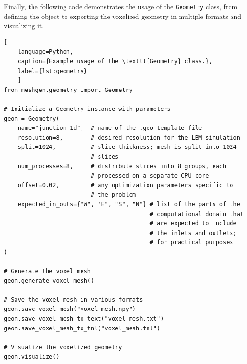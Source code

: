 Finally, the following code demonstrates the usage of the \texttt{Geometry} class, from defining the object to exporting the voxelized geometry in multiple formats and visualizing it.

\begin{lstlisting}[
	language=Python,
	caption={Example usage of the \texttt{Geometry} class.},
	label={lst:geometry}
	]
from meshgen.geometry import Geometry
	
# Initialize a Geometry instance with parameters
geom = Geometry(
	name="junction_1d",  # name of the .geo template file
	resolution=8,        # desired resolution for the LBM simulation
	split=1024,          # slice thickness; mesh is split into 1024 
						 # slices
	num_processes=8,     # distribute slices into 8 groups, each
						 # processed on a separate CPU core
	offset=0.02,		 # any optimization parameters specific to
						 # the problem
	expected_in_outs={"W", "E", "S", "N"} # list of the parts of the
										  # computational domain that
										  # are expected to include 
										  # the inlets and outlets;
										  # for practical purposes
)
	
# Generate the voxel mesh
geom.generate_voxel_mesh()

# Save the voxel mesh in various formats
geom.save_voxel_mesh("voxel_mesh.npy")
geom.save_voxel_mesh_to_text("voxel_mesh.txt")
geom.save_voxel_mesh_to_tnl("voxel_mesh.tnl")

# Visualize the voxelized geometry
geom.visualize()
\end{lstlisting}

